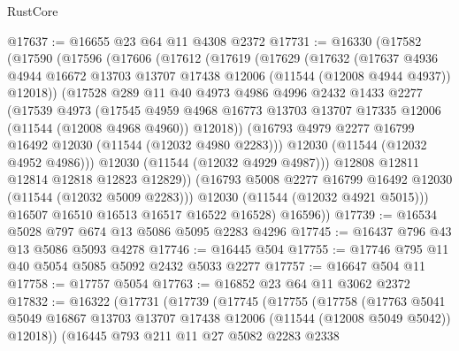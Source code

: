 \begin{lexlean}{RustCore}
\begin{coremodule}
@17637 := @16655 @23 @64 @11 @4308 @2372
@17731 := @16330
    (@17582
      (@17590
        (@17596
          (@17606
            (@17612
              (@17619
                (@17629
                  (@17632
                    (@17637
                      @4936
                      @4944
                      @16672
                      @13703
                      @13707
                      @17438
                      @12006
                      (@11544 (@12008 @4944 @4937))
                      @12018))
                  (@17528
                    @289
                    @11
                    @40
                    @4973
                    @4986
                    @4996
                    @2432
                    @1433
                    @2277
                    (@17539
                      @4973
                      (@17545
                        @4959
                        @4968
                        @16773
                        @13703
                        @13707
                        @17335
                        @12006
                        (@11544 (@12008 @4968 @4960))
                        @12018))
                    (@16793 @4979 @2277 @16799 @16492 @12030 (@11544 (@12032 @4980 @2283)))
                    @12030
                    (@11544 (@12032 @4952 @4986)))
                  @12030
                  (@11544 (@12032 @4929 @4987)))
                @12808
                @12811
                @12814
                @12818
                @12823
                @12829))
            (@16793 @5008 @2277 @16799 @16492 @12030 (@11544 (@12032 @5009 @2283)))
            @12030
            (@11544 (@12032 @4921 @5015)))
          @16507
          @16510
          @16513
          @16517
          @16522
          @16528)
        @16596))
@17739 := @16534 @5028 @797 @674 @13 @5086 @5095 @2283 @4296
@17745 := @16437 @796 @43 @13 @5086 @5093 @4278
@17746 := @16445 @504
@17755 := @17746 @795 @11 @40 @5054 @5085 @5092 @2432 @5033 @2277
@17757 := @16647 @504 @11
@17758 := @17757 @5054
@17763 := @16852 @23 @64 @11 @3062 @2372
@17832 := @16322
    (@17731
      (@17739
        (@17745
          (@17755
            (@17758
              (@17763
                @5041
                @5049
                @16867
                @13703
                @13707
                @17438
                @12006
                (@11544 (@12008 @5049 @5042))
                @12018))
            (@16445
              @793
              @211
              @11
              @27
              @5082
              @2283
              @2338

\end{coremodule}
\end{lexlean}
